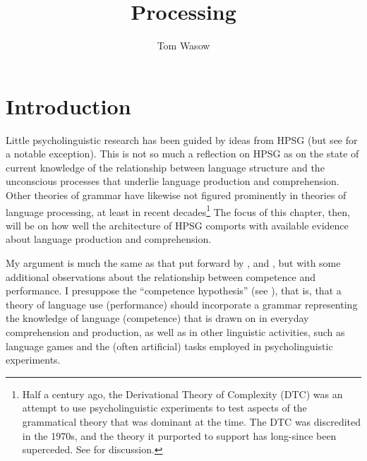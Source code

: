 \documentclass[a4paper]{article}
\title{Processing}
\author{Tom Wasow}
\begin{document}
\label{chap-processing}
\maketitle


\section{Introduction}

Little psycholinguistic research has been guided by ideas from HPSG (but see  \citet{Konieczny96a-u} for a notable exception).  This is not so much a reflection on HPSG as on the state of current knowledge of the relationship between language structure and the unconscious processes that underlie language production and comprehension.  Other theories of grammar have likewise not figured prominently in theories of language processing, at least in recent decades\footnote{Half a century ago, the Derivational Theory of Complexity (DTC) was an attempt to use psycholinguistic experiments to test aspects of the grammatical theory that was dominant at the time.  The DTC was discredited in the 1970s, and the theory it purported to support has long-since been superceded.  See \citet{FBG74a-u} for discussion.}  The focus of this chapter, then, will be on how well the architecture of HPSG comports with available evidence about language production and comprehension.  

My argument is much the same as that put forward by \citet[Chapter~9]{SWB2003a}, and \citet{SW2011a,SW2015a}, but with some additional observations about the relationship between competence and performance. I presuppose the ``competence hypothesis'' (see \citealt[Chapter~1]{Chomsky65a}), that is, that a theory of language use (performance) should incorporate a grammar representing the knowledge of language (competence) that is drawn on in everyday comprehension and production, as well as in other linguistic activities, such as language games and the (often artificial) tasks employed in psycholinguistic experiments.  
\end{document}
